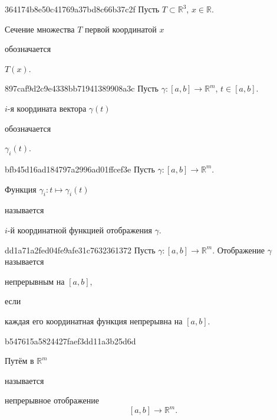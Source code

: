 \begin{note}{364174b8e50c41769a37bd8c66b37c2f}
    Пусть \({ T \subset \mathbb R^3 }\), \({ x \in \mathbb R }\).
    \begin{icloze}{2}Сечение множества \({ T }\) первой  координатой \({ x }\)\end{icloze} обозначается \begin{icloze}{1}\({ T(x) }\).\end{icloze}
\end{note}

\begin{note}{897caf9d2c9e4338bb71941389908a3c}
    Пусть \({ \gamma : [a, b] \to \mathbb R^{m} }\), \({ t \in [a, b] }\).
    \begin{icloze}{2}\({ i }\)-я координата вектора \({ \gamma(t) }\)\end{icloze} обозначается \begin{icloze}{1}\({ \gamma_i(t) }\).\end{icloze}
\end{note}

\begin{note}{bfb45d16ad184797a2996ad01ffcef3e}
    Пусть \({ \gamma : [a, b] \to \mathbb R^{m} }\).
    \begin{icloze}{2}Функция \({ \gamma_i : t \mapsto \gamma_i(t) }\)\end{icloze} называется \begin{icloze}{1}\({ i }\)-й координатной функцией отображения \({ \gamma }\).\end{icloze}
\end{note}

\begin{note}{dd1a71a2fed04fe9afe31c7632361372}
    Пусть \({ \gamma : [a, b] \to \mathbb R^{m} }\).
    Отображение \({ \gamma }\) называется \begin{icloze}{2}непрерывным на \({ [a, b] }\),\end{icloze} если \begin{icloze}{1}каждая его координатная функция непрерывна на \({ [a, b] }\).\end{icloze}
\end{note}

\begin{note}{b547615a5824427faef3dd11a3b25d6d}
    \begin{icloze}{2}Путём в \({ \mathbb R^{m} }\)\end{icloze} называется
    \begin{icloze}{1}
        непрерывное отображение
        \[
            [a, b] \to \mathbb R^{m}.
        \]
    \end{icloze}
\end{note}


